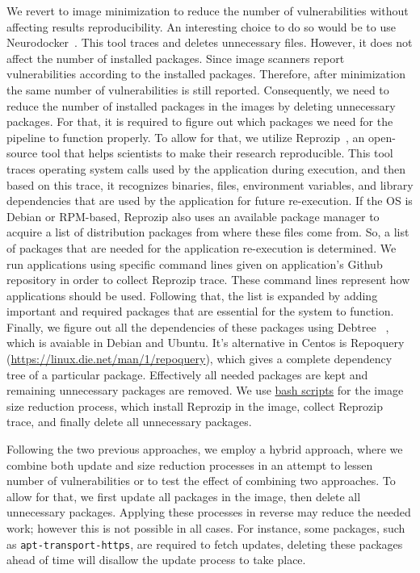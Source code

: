 \documentclass[a4paper,num-refs]{oup-contemporary}
\begin{document}
We revert to image minimization to reduce the number of vulnerabilities without affecting results reproducibility.
An interesting choice to do so would be to use 
Neurodocker~\cite{neurodocker}.
This tool traces and deletes unnecessary files.
However, it does not affect the number of installed packages.
Since image scanners report vulnerabilities according to the installed
packages. Therefore, after
minimization the same number of vulnerabilities is still reported.
Consequently, we need to reduce the number of installed packages
in the images by deleting unnecessary packages. For that, it is required to figure
out which packages we need for the pipeline to function properly. To allow for that, we utilize
Reprozip~\cite{rampin2016reprozip}, an open-source tool that
helps scientists to make their research reproducible. This tool traces operating system calls used by the
application during execution, and then based on this trace, it recognizes binaries, files, environment variables,
and library dependencies that are used by the application for future re-execution. If the OS is
Debian or RPM-based, Reprozip also
uses an available package manager to acquire a list of distribution packages from where these files come from.
So, a list of packages that are needed for the application re-execution is determined. We run applications
using specific command lines given on application's Github repository in order to collect Reprozip trace.
These command lines represent how applications should be used.
Following that, the list
is expanded by adding important and required packages that are essential
for the system to function. Finally, we figure out all the dependencies of these packages using Debtree
~\cite{debtree}, which is avaiable in Debian and Ubuntu. It's alternative in Centos is Repoquery (\url{https://linux.die.net/man/1/repoquery}), which
gives a complete dependency tree of a particular package.
Effectively all needed packages are kept and remaining unnecessary packages are removed. We use
\href{https://github.com/kaurbhupinder/Vulnerability-Analysis/tree/master/Scripts/minification}{bash scripts} for
the image size reduction process, which install Reprozip in the image, collect Reprozip trace, and
finally delete all unnecessary packages.

Following the two previous approaches, we employ a hybrid approach, where
we combine both update and size reduction processes in an attempt to
lessen number of vulnerabilities or to test the effect of
combining two approaches. To allow for that, we first update all packages in
the image, then delete all unnecessary packages. Applying these processes in reverse
may reduce the needed work; however this is not possible in all cases. For instance,
some packages, such as \texttt{apt-transport-https}, are required to fetch updates, deleting these packages
ahead of time will disallow the update process to take place.
\vspace*{-2mm}
\end{document}

